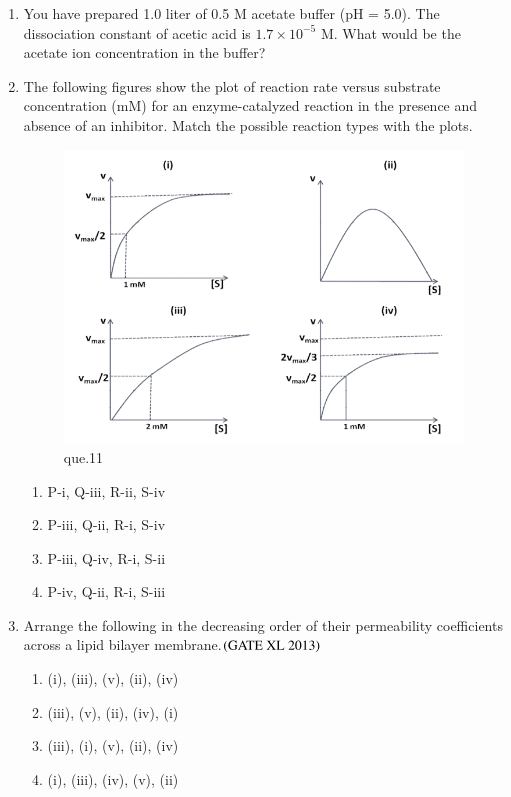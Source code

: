 \documentclass[journal]{IEEEtran}
\begin{document}
\begin{enumerate}
\item You have prepared 1.0 liter of 0.5 M acetate buffer (pH = 5.0). The dissociation constant of acetic acid is $1.7 \times 10^{-5}$ M. What would be the acetate ion concentration in the buffer?\hfill  \textit{}
\begin{enumerate}
\end{enumerate}

\item The following figures show the plot of reaction rate versus substrate concentration (mM) for an enzyme-catalyzed reaction in the presence and absence of an inhibitor. Match the possible reaction types with the plots.\hfill  \textit{}
\begin{figure}
    \includegraphics[width=0.5\columnwidth]{figs/Screenshot 2025-08-05 123225.png}
    \caption{que.11}
\end{figure}
\begin{enumerate}
    \item P-i, Q-iii, R-ii, S-iv
    \item P-iii, Q-ii, R-i, S-iv
    \item P-iii, Q-iv, R-i, S-ii
    \item P-iv, Q-ii, R-i, S-iii
\end{enumerate}

\item Arrange the following in the decreasing order of their permeability coefficients across a lipid bilayer membrane.\hfill $\left(\text{GATE XL 2013}\right)$
\begin{enumerate}
    \item (i), (iii), (v), (ii), (iv)
    \item (iii), (v), (ii), (iv), (i)
    \item (iii), (i), (v), (ii), (iv)
    \item (i), (iii), (iv), (v), (ii)
\end{enumerate}


\end{enumerate}
\end{document}
